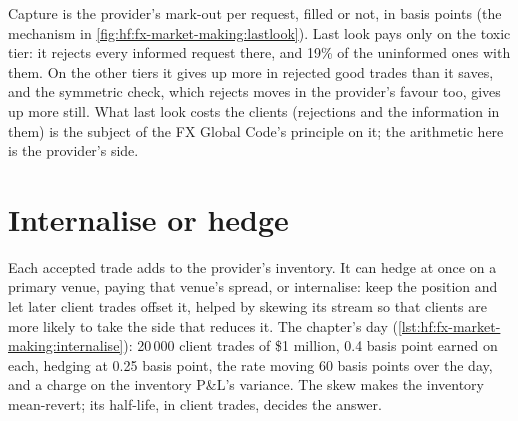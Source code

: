 Capture is the provider's mark-out per request, filled or not, in basis points (the mechanism in
\cref{fig:hf:fx-market-making:lastlook}). Last look pays only on the toxic tier: it rejects every informed
request there, and 19\% of the uninformed ones with them. On the other tiers it gives up more in rejected good trades than it saves, and the
symmetric check, which rejects moves in the provider's favour too, gives up more still. What last look costs the clients (rejections and the
information in them) is the subject of the FX Global Code's principle on it; the arithmetic here is the provider's side.

\section{Internalise or hedge}

Each accepted trade adds to the provider's inventory. It can hedge at once on a primary venue, paying that venue's spread, or internalise: keep the
position and let later client trades offset it, helped by skewing its stream so that clients are more likely to take the side that reduces it. The
chapter's day (\cref{lst:hf:fx-market-making:internalise}): 20\,000 client trades of \$1 million, 0.4 basis point earned on each, hedging at 0.25
basis point, the rate moving 60 basis points over the day, and a charge on the inventory P\&L's variance. The skew makes the inventory
mean-revert; its half-life, in client trades, decides the answer.

